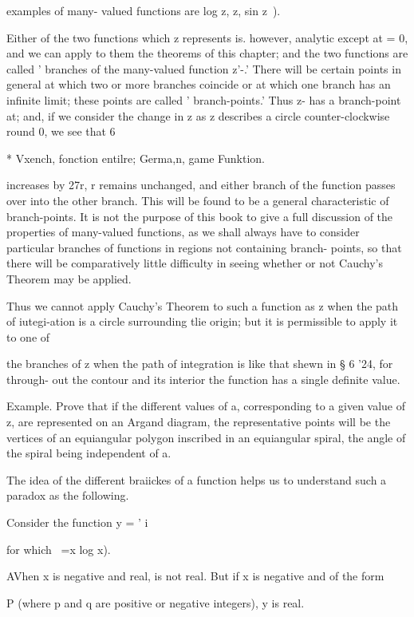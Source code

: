 {{{{examples of many- valued functions are log z, z, sin z~).

Either of the two functions which z represents is. however, analytic
except at = 0, and we can apply to them the theorems of this chapter;
and the two functions are called ' branches of the many-valued
function z'-.' There will be certain points in general at which two or
more branches coincide or at which one branch has an infinite limit;
these points are called ' branch-points.' Thus z- has a branch-point
at; and, if we consider the change in z as z describes a circle
counter-clockwise round 0, we see that 6

* Vxench, fonction entilre; Germa,n, game Funktion.

%
%

increases by 27r, r remains unchanged, and either branch of the
function passes over into the other branch. This will be found to be a
general characteristic of branch-points. It is not the purpose of this
book to give a full discussion of the properties of many-valued
functions, as we shall always have to consider particular branches of
functions in regions not containing branch- points, so that there will
be comparatively little difficulty in seeing whether or not Cauchy's
Theorem may be applied.

Thus we cannot apply Cauchy's Theorem to such a function as z when the
path of iutegi-ation is a circle surrounding tlie origin; but it is
permissible to apply it to one of

the branches of z when the path of integration is like that shewn in §
6 '24, for through- out the contour and its interior the function has
a single definite value.

Example. Prove that if the different values of a, corresponding to a
given value of z, are represented on an Argand diagram, the
representative points will be the vertices of an equiangular polygon
inscribed in an equiangular spiral, the angle of the spiral being
independent of a.


The idea of the different braiickes of a function helps us to
understand such a paradox as the following.

Consider the function y = ' i

for which ~=x log x).

AVhen x is negative and real, is not real. But if x is negative and of
the form

P (where p and q are positive or negative integers), y is real.

}}}}
